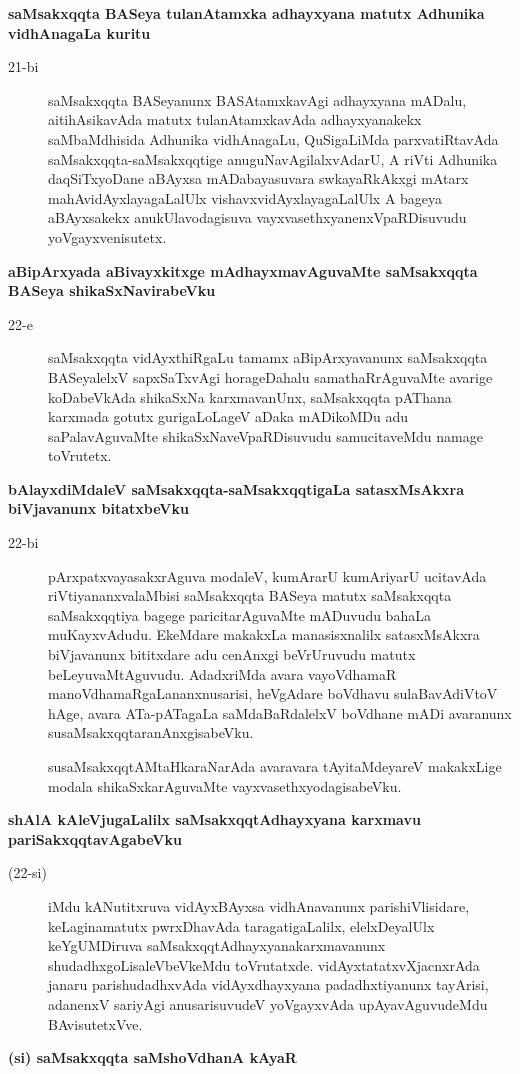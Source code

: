 {\bigskip
\noindent
{\large\bf saMsakxqqta BASeya tulanAtamxka adhayxyana matutx Adhunika vidhAnagaLa kuritu}}\label{page52}
\begin{description}
\item[21-bi] saMsakxqqta BASeyanunx BASAtamxkavAgi adhayxyana mADalu, aitihAsikavAda matutx tulanAtamxkavAda adhayxyanakekx saMbaMdhisida Adhunika vidhAnagaLu, QuSigaLiMda parxvatiRtavAda saMsakxqqta-saMsakxqqtige anuguNa\-vAgilalx\-vAdarU, A riVti Adhunika daqSiTx\-yoDane aBAyxsa mADa\-bayasu\-vara swkayaR\-kAkxgi mAtarx mahAvidAyxlayagaLalUlx vishavxvidAyxlayagaLalUlx A bageya aBAyx\-sakekx anu\-kUla\-voda\-gisuva vayxvasethxyanenxVpaRDisuvudu yoVgayxvenisutetx.
\end{description}
{\noindent
{\large\bf aBipArxyada aBivayxkitxge mAdhayxmavAguvaMte saMsakxqqta BASeya shikaSxNavirabeVku}}\label{page52}
\begin{description}
\item[22-e] saMsakxqqta vidAyxthiRgaLu tamamx aBipArxyavanunx saMsakxqqta BASeyalelxV sapxSaTxvAgi hora\-geDa\-halu sama\-thaR\-rAgu\-vaMte avarige koDa\-beVkAda shikaSxNa karxma\-vanUnx, saMsakxqqta pAThana karxmada gotutx guri\-gaLo\-LageV aDaka mADi\-koMDu adu saPala\-vAgu\-vaMte shikaSxNa\-veVpaRDisu\-vudu samucita\-veMdu namage toVrutetx.
\end{description}
{\noindent
{\large\bf bAlayxdiMdaleV saMsakxqqta-saMsakxqqtigaLa satasxMsAkxra biVjavanunx bitatxbeVku}}\label{page53}
\begin{description}
\item[22-bi] pArxpatxvayasakxrAguva modaleV, kumArarU kumAriyarU ucitavAda riVti\-yananx\-va\-laMbisi saMsakxqqta BASeya matutx saMsakxqqta saMsakxqqtiya bagege paricitarAguvaMte mADuvudu bahaLa muKayxvAdudu. EkeMdare makakxLa manasisxnalilx satasxMsAkxra biVjavanunx bititxdare adu cenAnxgi beVrUru\-vudu matutx beLeyuvaMtAguvudu. AdadxriMda avara vayoVdhamaR manoV\-dhamaR\-gaLa\-nanxnu\-sarisi, heVgAdare boVdhavu sulaBavAdiVtoV hAge, avara ATa-pATagaLa saMdaBaRdalelxV boV\-dhane mADi avaranunx susaMsakxqqtaranAnxgisabeVku.

susaMsakxqqtAMtaHkaraNarAda avaravara tAyitaMdeyareV makakxLige modala shikaSxkarAguvaMte vayxva\-sethxyodagisabeVku.
\end{description}
{\noindent
{\large\bf shAlA kAleVjugaLalilx saMsakxqqtAdhayxyana karxmavu pariSakxqqtavAgabeVku}}\label{page53}
\begin{description}
\item[(22-si)] iMdu kANutitxruva vidAyxBAyxsa vidhAnavanunx parishiVlisidare, keLagina\break matutx pwrxDhavAda taragati\-gaLalilx, elelxDeyalUlx keYgUMDiruva saMsakxqqtA\-dhayx\-yanakarxmavanunx shudadhxgoLisaleVbeVkeMdu toVrutatxde. vidAyxtatatxvXjacnxrAda janaru parishudadhxvAda vidAyxdhayxyana padadhxtiyanunx tayArisi,
adanenxV sari\-yAgi anusarisuvudeV yoVgayxvAda upAyavAguvudeMdu BAvisu\-tetxVve.
\end{description}
{\noindent
{\large\bf (si) saMsakxqqta saMshoVdhanA kAyaR}}\label{page53}

